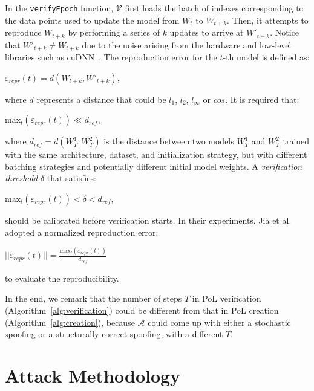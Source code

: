 \documentclass[conference]{IEEEtran}
\newcommand{\Verif}{\mathcal{V}\xspace}
\newcommand{\Adv}{\mathcal{A}\xspace}
\begin{document}
In the \texttt{verifyEpoch} function, $\Verif$ first loads the batch of indexes corresponding to the data points used to update the model from $W_t$ to $W_{t+k}$.
Then, it attempts to reproduce $W_{t+k}$ by performing a series of $k$ updates to arrive at $W'_{t+k}$. 
Notice that $W'_{t+k} \neq W_{t+k}$ due to the noise arising from the hardware and low-level libraries such as cuDNN~\cite{chetlur2014cudnn}.
The {reproduction\EndAccSupp{}} error for the $t$-th model is defined as:
\begin{center}
    $\varepsilon_{\mathit{repr}}(t) = d(W_{t+k}, W'_{t+k})$,
\end{center}
where $d$ represents a distance that could be $l_1$, $l_2$, $l_{\infty}$ or $cos$.
It is required that:
\begin{center}
    $\mathrm{max}_t(\varepsilon_{\mathit{repr}}(t)) \ll d_{\mathit{ref}}$,
\end{center}
where $d_{\mathit{ref}} = d(W_T^1, W_T^2)$ is the distance between two models $W_T^1$ and $W_T^2$ trained with the same architecture, dataset, and initialization strategy, but with  different batching strategies and potentially different initial model weights.
A {\em verification threshold} $\delta$ that satisfies:
\begin{center}
   $\mathrm{max}_t(\varepsilon_{\mathit{repr}}(t)) < \delta < d_{\mathit{ref}}$,
\end{center}
should be calibrated before verification starts.
In their experiments, Jia {et\EndAccSupp{}} al.~\cite{PoL} adopted a {normalized\EndAccSupp{}} {reproduction\EndAccSupp{}} error:
\begin{center}
    $||\varepsilon_{\mathit{repr}}(t)|| = \frac{\mathrm{max}_t(\varepsilon_{\mathit{repr}}(t))}{d_{\mathit{ref}}}$
\end{center}
to evaluate the reproducibility.





In the end, we remark that the number of steps $T$ in PoL verification (Algorithm~\ref{alg:verification}) could be different from that in PoL {creation\EndAccSupp{}} (Algorithm~\ref{alg:creation}),
because $\Adv$ could come up with either a stochastic {spoofing\EndAccSupp{}} or a structurally correct spoofing, with a different $T$.   


 
\section{Attack Methodology}
\label{sec:attack}
\end{document}
